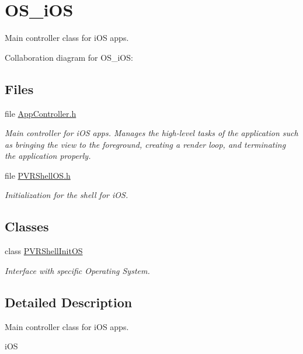 \hypertarget{group___o_s__i_o_s}{\section{O\+S\+\_\+i\+O\+S}
\label{group___o_s__i_o_s}
}


Main controller class for i\+O\+S apps.  


Collaboration diagram for O\+S\+\_\+i\+O\+S\+:
\subsection*{Files}
\begin{DoxyCompactItemize}
\item 
file \hyperlink{i_o_s_2_app_controller_8h}{App\+Controller.\+h}
\begin{DoxyCompactList}\small\item\em Main controller for i\+O\+S apps. Manages the high-\/level tasks of the application such as bringing the view to the foreground, creating a render loop, and terminating the application properly. \end{DoxyCompactList}\item 
file \hyperlink{i_o_s_2_p_v_r_shell_o_s_8h}{P\+V\+R\+Shell\+O\+S.\+h}
\begin{DoxyCompactList}\small\item\em Initialization for the shell for i\+O\+S. \end{DoxyCompactList}\end{DoxyCompactItemize}
\subsection*{Classes}
\begin{DoxyCompactItemize}
\item 
class \hyperlink{class_p_v_r_shell_init_o_s}{P\+V\+R\+Shell\+Init\+O\+S}
\begin{DoxyCompactList}\small\item\em Interface with specific Operating System. \end{DoxyCompactList}\end{DoxyCompactItemize}


\subsection{Detailed Description}
Main controller class for i\+O\+S apps. 

i\+O\+S




